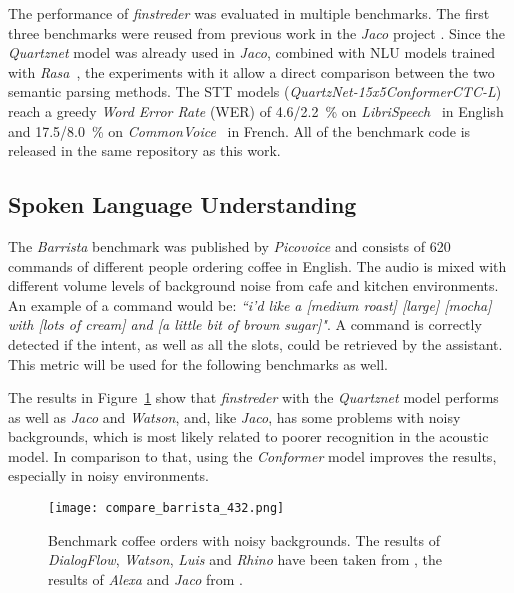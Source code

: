 \documentclass[a4paper]{article}
\begin{document}
The performance of \textit{finstreder} was evaluated in multiple benchmarks. The first three benchmarks were reused from previous work in the \textit{Jaco} project \cite{JACO}. 
Since the \textit{Quartznet} model was already used in \textit{Jaco}, combined with NLU models trained with \textit{Rasa}~\cite{RASA}, the experiments with it allow a direct comparison between the two semantic parsing methods. The STT models \mbox{(\textit{QuartzNet-15x5}\textit{ConformerCTC-L})} reach a greedy \textit{Word Error Rate} (WER) of \SI{4.6/2.2}{\percent} on \textit{LibriSpeech}~\cite{LIBSPE} in English and \SI{17.5/8.0}{\percent} on \textit{CommonVoice}~\cite{COMV} in French. 
All of the benchmark code is released in the same repository as this work.

\subsection{Spoken Language Understanding}

\vspace{9pt}
The \textit{Barrista} benchmark was published by \textit{Picovoice} \cite{RHIBEN} and consists of 620 commands of different people ordering coffee in English. The audio is mixed with different volume levels of background noise from cafe and kitchen environments. An example of a command would be: \textit{``i'd like a [medium roast] [large] [mocha] with [lots of cream] and [a little bit of brown sugar]"}. A command is correctly detected if the intent, as well as all the slots, could be retrieved by the assistant. This metric will be used for the following benchmarks as well.

The results in Figure~\ref{fig:bb} show that \textit{finstreder} with the \textit{Quartznet} model performs as well as \textit{Jaco} and \textit{Watson}, and, like \textit{Jaco}, has some problems with noisy backgrounds, which is most likely related to poorer recognition in the acoustic model. In comparison to that, using the \textit{Conformer} model improves the results, especially in noisy environments.

\begin{figure}[!htbp]
	\centering
	\texttt{[image: compare\_barrista\_432.png]}
	\vspace{-7pt}
	\caption{Benchmark coffee orders with noisy backgrounds. The results of \textit{DialogFlow}, \textit{Watson}, \textit{Luis} and \textit{Rhino} have been taken from \cite{RHIBEN}, the results of \textit{Alexa} and \textit{Jaco} from \cite{JACO}.}
	\label{fig:bb}
\end{figure}
\end{document}
